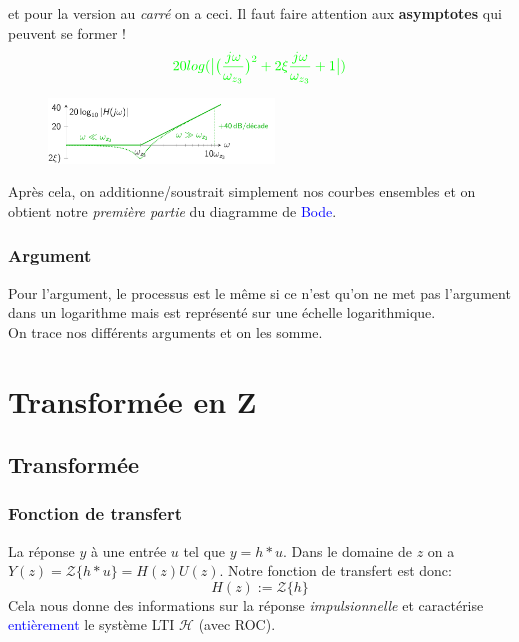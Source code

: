 \documentclass{report}
\begin{document}
et pour la version au \textit{carré} on a ceci. Il faut faire attention aux \textbf{asymptotes} qui peuvent se former !
\begin{align*}
\textcolor{green}{20log(\bigr|  \bigr(\frac{j\omega}{\omega_{z_3}}\bigr)^2 + 2 \xi \frac{j\omega}{\omega_{z_3}} +1 \bigr|)}
\end{align*}
\begin{figure}[H]
\centering
\includegraphics[width=6cm]{img/jomegamax.png}
\end{figure}
Après cela, on additionne/soustrait simplement nos courbes ensembles et on obtient notre \textit{première partie} du diagramme de \textcolor{blue}{Bode}.

\subsection{Argument}
Pour l'argument, le processus est le même si ce n'est qu'on ne met pas l'argument dans un logarithme mais est représenté sur une échelle logarithmique.\\
On trace nos différents arguments et on les somme.

\chapter{Transformée en Z}
\section{Transformée}
\subsection{Fonction de transfert}
La réponse $y$ à une entrée $u$ tel que $y = h \ast u $. Dans le domaine de $z$ on a $Y(z) = \mathcal{Z}\{h \ast u \} = H(z) U(z)$. Notre fonction de transfert est donc:
\begin{equation}
H(z) := \mathcal{Z}\{h\}
\end{equation}
Cela nous donne des informations sur la réponse \textit{impulsionnelle} et caractérise \textcolor{blue}{entièrement} le système LTI $\mathcal{H}$ (avec ROC).
\end{document}
